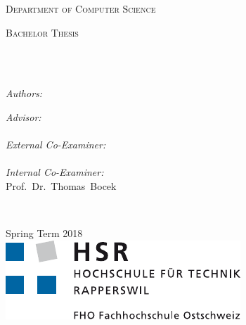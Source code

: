 \begin{titlepage}
\begin{center}

\vspace*{.06\textheight}
{\scshape\LARGE \univname\par} %

{\scshape\large Department of Computer Science\par}\vspace{1.2cm} %
\textsc{\Large Bachelor Thesis}\\[0.5cm] %

\HRule \\[0.4cm] %
{\huge \bfseries \ttitle\par}\vspace{0.4cm} %
\HRule \\[1.5cm] %
 
\begin{minipage}[t]{0.4\textwidth}
\begin{flushleft} \large
\emph{Authors:}\\
\authorname %
\end{flushleft}
\end{minipage}
\begin{minipage}[t]{0.4\textwidth}
\begin{flushright} \large
\emph{Advisor:} \\
\supname \\[1cm]
\emph{External Co-Examiner:} \\
\examname \\[1cm]
\emph{Internal Co-Examiner:} \\
Prof.~Dr.~Thomas~Bocek \\[1cm]
\end{flushright}
\end{minipage}\\[3cm]
 
\vfill

{\large Spring Term 2018}\\[4cm] %
\includegraphics{resources/logo_hsr} %
 
\vfill
\end{center}
\end{titlepage}

